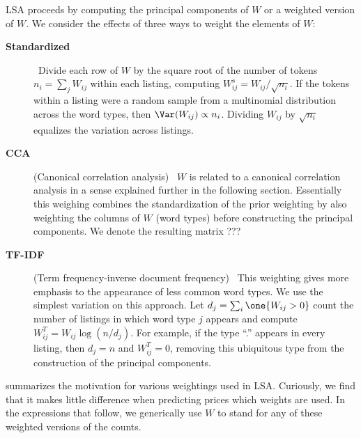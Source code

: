 \documentclass[10pt]{article}
\begin{document}
LSA proceeds by computing the principal components of $W$ or a weighted version of $W$.   We consider the effects of three ways to weight the elements of $W$:
\begin{description}
  \item[ {\bf Standardized} ] \ Divide each row of $W$ by the square root of the
 number of tokens $n_i = \sum_j W_{ij}$ within each listing, computing $W^s_{ij}
 = W_{ij}/\sqrt{n_i}$.  If the tokens within a listing were a random sample from
 a multinomial distribution across the word types, then $\Var(W_{ij}) \propto
 n_i$.  Dividing $W_{ij}$ by $\sqrt{n_i}$ equalizes the variation across
 listings.
   \item[ {\bf CCA}] (Canonical correlation analysis) \ $W$ is related to a
 canonical correlation analysis in a sense explained further in the following
 section.  Essentially this weighing combines the standardization of the prior
 weighting by also weighting the columns of $W$ (word types) before constructing
 the principal components.  We denote the resulting matrix ???
  \item [{\bf TF-IDF}] (Term frequency-inverse document frequency) \ This
 weighting gives more emphasis to the appearance of less common word types. We
 use the simplest variation on this approach.  Let $d_j = \sum _i\one{W_{ij} >
 0}$ count the number of listings in which word type $j$ appears and compute
 $W^{T}_{ij} = W_{ij} \log(n/d_j)$.  For example, if the type ``.'' appears in
 every listing, then $d_j = n$ and $W^{T}_{ij} = 0$, removing this ubiquitous
 type from the construction of the principal components.
\end{description}
 \citet{turney10} summarizes the motivation for various weightings used in LSA.
  Curiously, we find that it makes little difference when predicting prices
 which weights are used.  In the expressions that follow, we generically use $W$
 to stand for any of these weighted versions of the counts.
 
\end{document}
